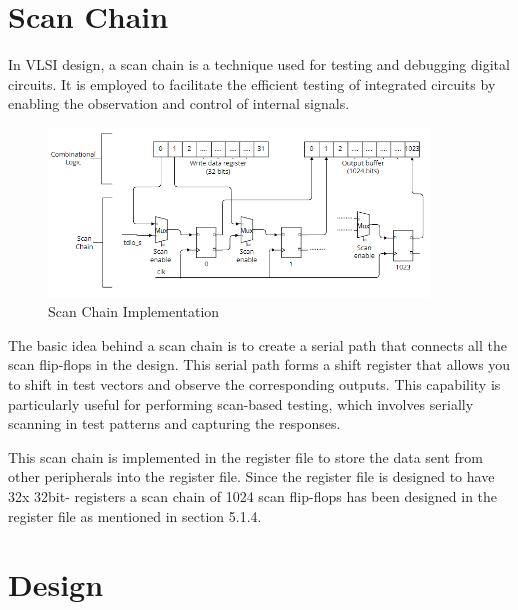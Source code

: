 \section{Scan Chain}

In VLSI design, a scan chain is a technique used for testing and debugging digital circuits. It is employed to facilitate the efficient testing of integrated circuits by enabling the observation and control of internal signals.
\vspace{2mm}

\begin{figure}[h] %
  \centering
  \setlength{\abovecaptionskip}{-10pt} %
  \setlength{\belowcaptionskip}{-10pt} %
  \includegraphics[width=0.9\textwidth]{Image/scan chain.png} %
  \caption{Scan Chain Implementation}
  \label{Figure 1 : Scan Chain Implementation}
\end{figure}
\vspace{2mm}
The basic idea behind a scan chain is to create a serial path that connects all the scan flip-flops in the design. This serial path forms a shift register that allows you to shift in test vectors and observe the corresponding outputs. This capability is particularly useful for performing scan-based testing, which involves serially scanning in test patterns and capturing the responses.


\vspace{2mm}
This scan chain is implemented in the register file to store the data sent from other peripherals into the register file. Since the register file is designed to have 32x 32bit- registers a scan chain of 1024 scan flip-flops has been designed in the register file as mentioned in section 5.1.4.
\vspace{5mm}
\section{Design}


